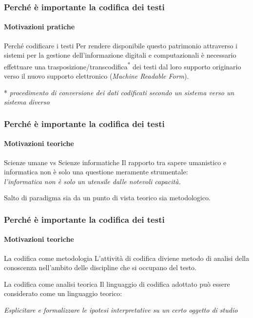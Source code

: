 \begin{frame}
    \frametitle{Perché è importante la codifica dei testi}
    \framesubtitle{Motivazioni pratiche}
    \addtocounter{nframe}{1}
    
    \begin{block}{Perché codificare i testi}
        Per rendere disponibile questo patrimonio attraverso i sistemi per la gestione dell'informazione digitali e computazionali è necessario effettuare una trasposizione/transcodifica\textsuperscript{*} dei testi dal loro supporto originario verso il nuovo supporto elettronico (\textit{Machine Readable Form}).
    \end{block}

    \begin{center}
        * \textit{procedimento di conversione dei dati codificati secondo un sistema verso un sistema diverso}
    \end{center}

\end{frame}

\begin{frame}
    \frametitle{Perché è importante la codifica dei testi}
    \framesubtitle{Motivazioni teoriche}
    \addtocounter{nframe}{1}
    
    \begin{block}{Scienze umane vs Scienze informatiche}
        Il rapporto tra sapere umanistico e informatica non è solo una questione meramente strumentale:\\ 
        \textit{l'informatica non è solo un utensile dalle notevoli capacità.}

        \begin{center}
            Salto di paradigma sia da un punto di vista teorico sia metodologico.
        \end{center} 
    \end{block}

\end{frame}

\begin{frame}
    \frametitle{Perché è importante la codifica dei testi}
    \framesubtitle{Motivazioni teoriche}
    \addtocounter{nframe}{1}
    
    \begin{block}{La codifica come metodologia}
        L'attività di codifica diviene metodo di analisi della conoscenza nell'ambito delle discipline che si occupano del testo.
     \end{block}

     \begin{block}{La codifica come analisi teorica}
     Il linguaggio di codifica adottato può essere considerato come un linguaggio teorico:
      
     \begin{center}
        \textit{Esplicitare e formalizzare le ipotesi interpretative su un certo oggetto di studio}
     \end{center} 
    \end{block}

\end{frame}

